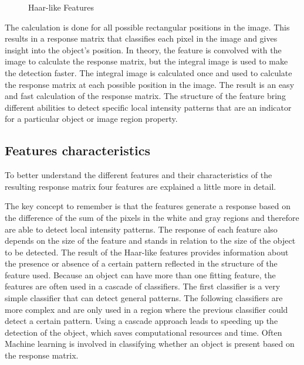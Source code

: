 \begin{figure}[h]
    \caption{Haar-like Features}
    \label{fig:haar_features}
\end{figure}

The calculation is done for all possible rectangular positions in the image. This results in a response matrix that classifies each pixel in the image and gives insight into the object's position. In theory, the feature is convolved with the image to calculate the response matrix, but the integral image is used to make the detection faster. The integral image is calculated once and used to calculate the response matrix at each possible position in the image.
The result is an easy and fast calculation of the response matrix. 
The structure of the feature bring different abilities to detect specific local intensity patterns that are an indicator for a particular object or image region property. 
\subsection{Features characteristics}
To better understand the different features and their characteristics of the resulting response matrix four features are explained a little more in detail. 

The key concept to remember is that the features generate a response based on the difference of the sum of the pixels in the white and gray regions and therefore are able to detect local intensity patterns. The response of each feature also depends on the size of the feature and stands in relation to the size of the object to be detected. The result of the Haar-like features provides information about the presence or absence of a certain pattern reflected in the structure of the feature used. Because an object can have more than one fitting feature, the features are often used in a cascade of classifiers. The first classifier is a very simple classifier that can detect general patterns. The following classifiers are more complex and are only used in a region where the previous classifier could detect a certain pattern. Using a cascade approach leads to speeding up the detection of the object, which saves computational resources and time. Often Machine learning is involved in classifying whether an object is present based on the response matrix. 


